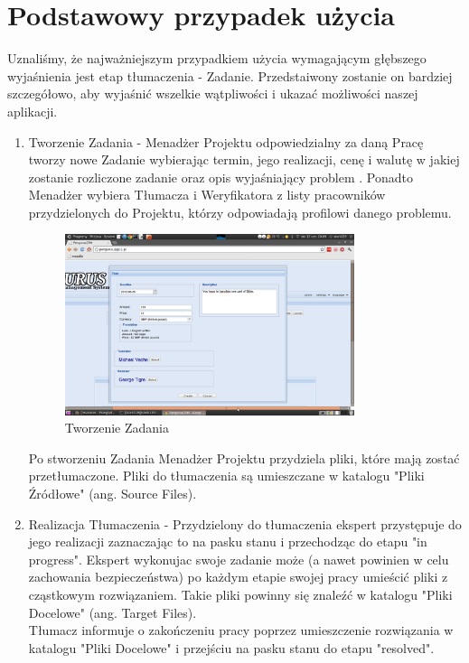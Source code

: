 \documentclass[licencjacka]{pracamgr}
\begin{document}
\section{Podstawowy przypadek użycia}
Uznaliśmy, że najważniejszym przypadkiem użycia wymagającym głębszego wyjaśnienia jest etap tłumaczenia - Zadanie. Przedstaiwony zostanie on bardziej szczegółowo, aby wyjaśnić wszelkie wątpliwości i ukazać możliwości naszej aplikacji.

\begin{enumerate}
\item	Tworzenie Zadania - Menadżer Projektu odpowiedzialny za daną Pracę tworzy nowe Zadanie wybierając termin, jego realizacji, cenę i walutę w jakiej zostanie rozliczone zadanie oraz opis wyjaśniający problem . Ponadto Menadżer wybiera Tłumacza i Weryfikatora z listy pracowników przydzielonych do Projektu, którzy odpowiadają profilowi danego problemu. \\
\begin{figure}[ht!]
\centering
\includegraphics[width=0.8\textwidth]{resources/task_create.png}
\caption{Tworzenie Zadania}
\end{figure}
Po stworzeniu Zadania Menadżer Projektu przydziela pliki, które mają zostać przetłumaczone. Pliki do tłumaczenia są umieszczane w katalogu "Pliki Źródłowe" (ang. Source Files).
\item 	Realizacja Tłumaczenia - Przydzielony do tłumaczenia ekspert przystępuje do jego realizacji zaznaczając to na pasku stanu i przechodząc do etapu "in progress". Ekspert wykonujac swoje zadanie może (a nawet powinien w celu zachowania bezpieczeństwa) po każdym etapie swojej pracy umieścić pliki z cząstkowym rozwiązaniem. Takie pliki powinny się znaleźć w katalogu "Pliki Docelowe" (ang. Target Files).\\
Tłumacz informuje o zakończeniu pracy poprzez umieszczenie rozwiązania w katalogu "Pliki Docelowe" i przejściu na pasku stanu do etapu "resolved".   

\end{enumerate}
\end{document}
